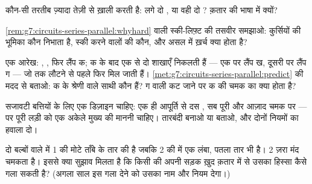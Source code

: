 \begin{exercise}[$\star$]\label{exo:g7:circuits-series-parallel:7}
 कौन-सी तरतीब ज़्यादा तेज़ी से ख़ाली करती है:  लगे दो
, या वही दो ? क़तार की भाषा में क्यों?
\end{exercise}

\begin{exercise}[$\star$]\label{exo:g7:circuits-series-parallel:8}
\cref{rem:g7:circuits-series-parallel:whyhard} वाली स्की-लिफ़्ट की
तसवीर समझाओ: कुर्सियों की भूमिका कौन निभाता है, स्की करने वालों की
कौन, और असल में ख़र्च क्या होता है?
\end{exercise}

\begin{exercise}[$\star\star$]\label{exo:g7:circuits-series-parallel:9}
एक आरेख: , , फिर लैंप क; क के बाद एक  से दो शाखाएँ
निकलती हैं --- एक पर लैंप ख, दूसरी पर लैंप ग --- जो  तक लौटने से
पहले फिर मिल जाती हैं।
\cref{met:g7:circuits-series-parallel:predict} की मदद से बताओ: क के
श्रेणी वाले साथी कौन हैं? ग वाली  कट जाने पर क की चमक का क्या
होता है?
\end{exercise}

\begin{exercise}[$\star\star$]\label{exo:g7:circuits-series-parallel:10}
सजावटी बत्तियों के लिए एक डिज़ाइन चाहिए: एक ही आपूर्ति से दस , सब
पूरी और आज़ाद चमक पर --- पर पूरी लड़ी को एक अकेले मुख्य  की माननी
चाहिए। तारबंदी बनाओ या बताओ, और दोनों नियमों का हवाला दो।
\end{exercise}

\begin{exercise}[$\star\star$]\label{exo:g7:circuits-series-parallel:11}
दो बल्बों वाले  में  1 की  मोटे ताँबे के तार की है
जबकि  2 की  में एक लंबा, पतला तार भी है।  2 ज़रा मंद चमकता
है। इससे क्या सुझाव मिलता है कि किसी  की अपनी सड़क ख़ुद क़तार में
से उसका हिस्सा कैसे गला सकती है? (अगला साल इस गला देने को उसका नाम और
नियम देगा।)
\end{exercise}

